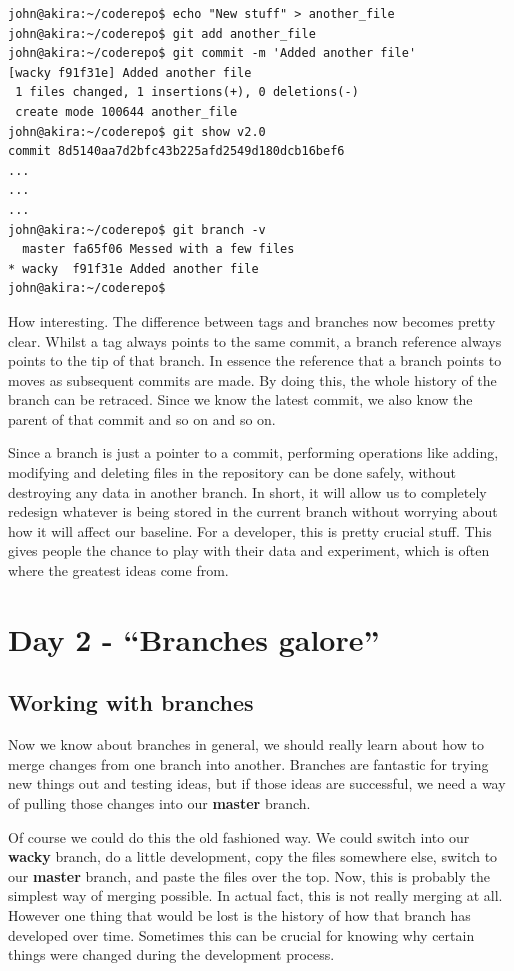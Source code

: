 \begin{Verbatim}[frame=leftline,framerule=1mm,fontsize=\relsize{-3}] 
john@akira:~/coderepo$ echo "New stuff" > another_file
john@akira:~/coderepo$ git add another_file
john@akira:~/coderepo$ git commit -m 'Added another file'
[wacky f91f31e] Added another file
 1 files changed, 1 insertions(+), 0 deletions(-)
 create mode 100644 another_file
john@akira:~/coderepo$ git show v2.0 
commit 8d5140aa7d2bfc43b225afd2549d180dcb16bef6
...
...
...
john@akira:~/coderepo$ git branch -v
  master fa65f06 Messed with a few files
* wacky  f91f31e Added another file
john@akira:~/coderepo$ 
\end{Verbatim}

How interesting.  The difference between tags and branches now becomes pretty clear.  Whilst a tag always points to the same commit, a branch reference always points to the tip of that branch.  In essence the reference that a branch points to moves as subsequent commits are made.  By doing this, the whole history of the branch can be retraced.  Since we know the latest commit, we also know the parent of that commit and so on and so on.

Since a branch is just a pointer to a commit, performing operations like adding, modifying and deleting files in the repository can be done safely, without destroying any data in another branch.  In short, it will allow us to completely redesign whatever is being stored in the current branch without worrying about how it will affect our baseline.  For a developer, this is pretty crucial stuff.  This gives people the chance to play with their data and experiment, which is often where the greatest ideas come from.

\section{Day 2 - ``Branches galore''}
\subsection{Working with branches}

Now we know about branches in general, we should really learn about how to merge changes from one branch into another.  Branches are fantastic for trying new things out and testing ideas, but if those ideas are successful, we need a way of pulling those changes into our \textbf{master} branch.  

Of course we could do this the old fashioned way.  We could switch into our \textbf{wacky} branch, do a little development, copy the files somewhere else, switch to our \textbf{master} branch, and paste the files over the top.  Now, this is probably the simplest way of merging possible.  In actual fact, this is not really merging at all.  However one thing that would be lost is the history of how that branch has developed over time.  Sometimes this can be crucial for knowing why certain things were changed during the development process.

